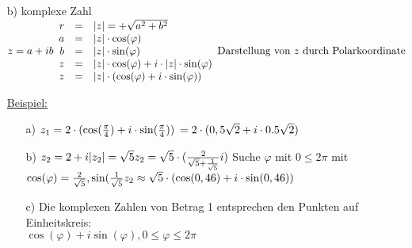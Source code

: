 \begin{enumerate}
\begin{figure}[h!]
\end{figure}
\\
  Umfang:$2\pi$\\
  $\varphi$ in Grad $\widehat{=} \frac{2\pi \cd \varphi}{360}$ im Bogenma\ss\\
   F\"ur Punkte mit kartesischen Koordinaten $\neq$ (0,0) werden als Polarkoordinate $(r,\varphi)$ verwendet.
\item[b)]komplexe Zahl $z = a +ib\\
\begin{array}{rcl}
r &=& \lvert z \rvert = + \sqrt{a^2+b^2}\\
a &=& \lvert z \rvert \cdot \cos(\varphi)\\
b &=& \lvert z \rvert \cdot \sin(\varphi)\\
z &=& \lvert z \rvert \cdot \cos(\varphi) + i \cdot \lvert z \rvert \cdot \sin(\varphi)\\
z &=& \lvert z \rvert \cdot ( \cos(\varphi) + i \cdot \sin(\varphi))\\
\end{array}\\
\text{Darstellung von $z$ durch Polarkoordinate}$
\item[\underline{Beispiel:}]\begin{enumerate}
\item[a)]$z_1 = 2 \cdot (\cos(\frac{\pi}{4})+i \cdot \sin(\frac{\pi}{4}))\\
\hspace*{2pt}= 2 \cdot (0,5\sqrt{2}+i \cdot 0.5\sqrt{2})$
\item[b)]$z_2 = 2+i\\
\lvert z_2 \rvert = \sqrt{5}\\
z_2 = \sqrt{5} \cdot (\frac{2}{\sqrt{5} + \frac{1}{\sqrt{5}}}i)$
Suche $\varphi$ mit $0 \leq 2\pi$ mit $\cos(\varphi) =\frac{2}{\sqrt{5}}, \sin(\frac{1}{\sqrt{5}} z_2 \approx \sqrt{5} \cdot (\cos(0,46) + i \cdot \sin(0,46))$
\item[c)] Die komplexen Zahlen von Betrag 1 entsprechen den Punkten auf Einheitskreis: \\$\cos(\varphi) + i \sin(\varphi), 0  \leq \varphi \leq 2\pi$
\end{enumerate}
\end{enumerate}
